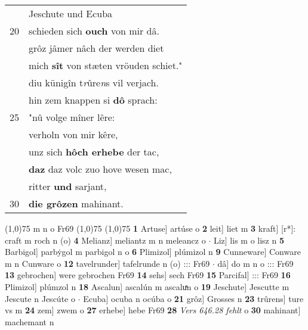\documentclass[8pt,a4paper,notitlepage]{article}
\begin{document}
\begin{table}[ht]
\begin{minipage}[t]{0.5\linewidth}
\begin{tabular}{rl}
 & Jeschute und Ecuba\\ 
20 & schieden sich \textbf{ouch} von mir dâ.\\ 
 & grôz jâmer nâch der werden diet\\ 
 & mich \textbf{sît} von stæten vröuden schiet."\\ 
 & diu künigîn t\textit{r}ûre\textit{n}s vil verjach.\\ 
 & hin zem knappen si \textbf{dô} sprach:\\ 
25 & "nû volge mîner lêre:\\ 
 & verholn von mir kêre,\\ 
 & unz sich \textbf{hôch erhebe} der tac,\\ 
 & \textbf{daz} daz volc zuo hove wesen mac,\\ 
 & ritter \textbf{und} sarjant,\\ 
30 & \textbf{die grôzen} mahinant.\\ 
\end{tabular}
\scriptsize
\line(1,0){75} \newline
m n o Fr69 \newline
\line(1,0){75} \newline
\newline
\line(1,0){75} \newline
\textbf{1} Artuse] artúse o \textbf{2} leit] liet m \textbf{3} kraft] [r*]: craft m roch n (o) \textbf{4} Melianz] meliantz m n meleancz o  $\cdot$ Liz] lis m o lisz n \textbf{5} Barbigol] parbẏgol m parbigol n o \textbf{6} Plimizol] plúmizol n \textbf{9} Cunneware] Conware m n Cunware o \textbf{12} tavelrunder] tafelrunde n (o) ::: Fr69  $\cdot$ dâ] do m n o ::: Fr69 \textbf{13} gebrochen] were gebrochen Fr69 \textbf{14} sehs] sech Fr69 \textbf{15} Parcifal] ::: Fr69 \textbf{16} Plimizol] plúmzol n \textbf{18} Ascalun] ascalún m ascaluͯn o \textbf{19} Jeschute] Jescutte m Jescute n Jescúte o  $\cdot$ Ecuba] ocuba n ocúba o \textbf{21} grôz] Grosses n \textbf{23} trûrens] ture vs m \textbf{24} zem] zwem o \textbf{27} erhebe] hebe Fr69 \textbf{28} \textit{Vers 646.28 fehlt} o  \textbf{30} mahinant] machemant n \newline
\end{minipage}
\end{table}
\newpage
\end{document}

